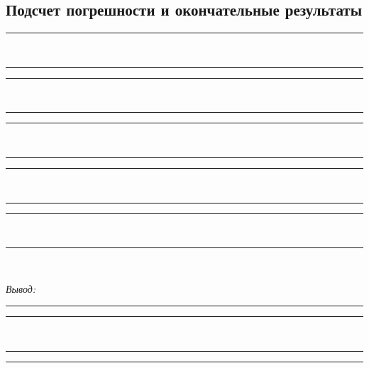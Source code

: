 \documentclass[10pt, pscyr, nonums]{hedlabwork}
\begin{document}
    \pagebreak
    
    \subsection{Подсчет погрешности и окончательные результаты}
    \center
    \rule{.95\textwidth}{.5pt} \\ \rule{.95\textwidth}{.5pt}
    \rule{.95\textwidth}{.5pt} \\ \rule{.95\textwidth}{.5pt}
    \rule{.95\textwidth}{.5pt} \\ \rule{.95\textwidth}{.5pt}
    \rule{.95\textwidth}{.5pt} \\ \rule{.95\textwidth}{.5pt}
    \rule{.95\textwidth}{.5pt} \\ \rule{.95\textwidth}{.5pt} \\
    \vspace*{2em}
    
    \emph{Вывод:} \rule{.885\textwidth}{.5pt}
    \rule{.95\textwidth}{.5pt} \\ \rule{.95\textwidth}{.5pt}
    \rule{.95\textwidth}{.5pt}
\end{document}
